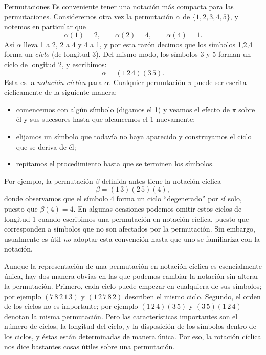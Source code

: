 \documentclass[11pt,spanish,makeidx]{amsbook}
\theoremstyle{definition}
\theoremstyle{remark}
\begin{document}
\begin{section}{Permutaciones}
Es conveniente tener una notación más compacta para las permutaciones. Consideremos otra vez la permutación $\alpha$ de $\{1,2,3,4,5\}$, y notemos en particular que
$$
\alpha(1)=2,\qquad \alpha(2)=4,\qquad \alpha(4)=1.
$$
Así $\alpha$ lleva 1 a 2, 2 a 4 y 4 a 1, y por esta razón decimos que los símbolos 1,2,4 forma un {\it ciclo } (de longitud 3). Del mismo modo, los símbolos 3 y 5 forman un ciclo de longitud 2, y
escribimos:
$$
\alpha=(1\,2\,4)(3\,5).
$$
Esta es la {\it notación cíclica} para $\alpha$. Cualquier  permutación $\pi$ puede ser escrita cíclicamente de la siguiente manera:
\begin{itemize}
\item comencemos con algún símbolo (digamos el 1) y veamos el efecto de $\pi$ sobre él y sus sucesores hasta que alcancemos el 1
nuevamente;
\item elijamos un símbolo que todavía no haya aparecido y construyamos el ciclo que se deriva de él; 
\item repitamos el procedimiento hasta que se terminen los símbolos.
\end{itemize}
Por ejemplo, la permutación $\beta$ definida antes tiene la notación cíclica
$$
\beta=(1\,3)(2\,5)(4),
$$
donde observamos que el símbolo 4 forma un ciclo ``degenerado'' por sí solo, puesto que $\beta(4)=4$. En algunas ocasiones podemos omitir estos ciclos de longitud 1 cuando escribimos una permutación en notación cíclica, puesto que corresponden a símbolos que no son afectados por la permutación. Sin embargo, usualmente es útil {\it no} adoptar esta convención hasta que uno se familiariza con la notación.

Aunque la representación de una permutación en notación cíclica es esencialmente única, hay dos manera obvias en las que podemos cambiar la notación sin alterar la permutación. Primero, cada ciclo puede empezar en cualquiera de sus símbolos; por ejemplo $(7\,8\,2\,1\,3)$ y $(1\,2\,7\,8\,2)$ describen el mismo ciclo. Segundo, el orden de los ciclos no es importante; por ejemplo $(1\,2\,4) (3\,5)$ y $(3\,5) (1\,2\,4)$ denotan la misma permutación. Pero las características importantes son el número de ciclos, la longitud del ciclo, y la disposición de los símbolos dentro de los ciclos, y éstas están determinadas de manera única. Por eso, la rotación cíclica nos dice bastantes cosas útiles sobre una permutación.


\end{section}
\end{document}
